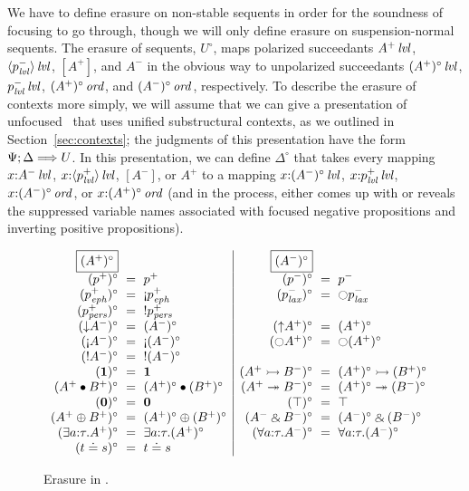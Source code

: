 We have to define erasure on non-stable sequents in order for the
soundness of focusing to go through, though we will only define
erasure on suspension-normal sequents.  The erasure of sequents,
$U^\circ$, maps polarized succeedants ${A^+}\,{{\it lvl}}$,
${\langle {p^-_{\it lvl}} \rangle}\,{{\it lvl}}$, $[A^+]$, and $A^-$ in the obvious way to
unpolarized succeedants ${(A^+)^\circ}\,{{\it lvl}}$, ${p^-_{\it lvl}}\,{{\it lvl}}$,
${(A^+)^\circ}\,{{\it ord}}$, and ${(A^-)^\circ}\,{{\it ord}}$, respectively.  To
describe the erasure of contexts more simply, we will assume that we
can give a presentation of unfocused \ollll~that uses unified
substructural contexts, as we outlined in
Section~\ref{sec:contexts}; the judgments of this presentation
have the form $\Psi; \Delta \Longrightarrow U$. 
In this presentation, we can define $\Delta^\circ$ that
takes every mapping $x{:}{A^-}\,{{\it lvl}}$, $x{:}{\langle {p^+_{\it lvl}} \rangle}\,{{\it lvl}}$,
$[A^-]$, or $A^+$ to a mapping $x{:}{(A^-)^\circ}\,{{\it lvl}}$,
$x{:}{p^+_{\it lvl}}\,{{\it lvl}}$, $x{:}{(A^-)^\circ}\,{{\it ord}}$, or
$x{:}{(A^+)^\circ}\,{{\it ord}}$ (and in the process, either comes up with
or reveals the suppressed variable names associated with focused
negative propositions and inverting positive propositions).

\begin{figure}
{\small \[
\begin{array}{rcl|rcl}
\fbox{$(A^+)^\circ$} & & &
\fbox{$(A^-)^\circ$} & & 
\\
(p^+)^\circ & \!\!\!=\!\!\! & p^+ &
(p^-)^\circ & \!\!\!=\!\!\! & p^- \\
(p^+_\meph)^\circ & \!\!\!=\!\!\! & {\gnab}p^+_\meph &
(p^-_\mlax)^\circ & \!\!\!=\!\!\! & {\ocircle}p^-_\mlax 
\\
(p^+_\mpers)^\circ & \!\!\!=\!\!\! & {!}p^+_\mpers &
& & 
\\
({\downarrow}A^-)^\circ & \!\!\!=\!\!\! & (A^-)^\circ &
({\uparrow}A^+)^\circ & \!\!\!=\!\!\! & (A^+)^\circ 
\\
({\gnab}A^-)^\circ & \!\!\!=\!\!\! & {\gnab}(A^-)^\circ &
({\ocircle}A^+)^\circ & \!\!\!=\!\!\! & {\ocircle}(A^+)^\circ 
\\
({!}A^-)^\circ & \!\!\!=\!\!\! & {!}(A^-)^\circ &
& & 
\\
(\one)^\circ & \!\!\!=\!\!\! & \one &
(A^+ \lefti B^-)^\circ & \!\!\!=\!\!\! & (A^+)^\circ \lefti (B^+)^\circ 
\\
(A^+ \fuse B^+)^\circ & \!\!\!=\!\!\! & (A^+)^\circ \fuse (B^+)^\circ &
(A^+ \righti B^-)^\circ & \!\!\!=\!\!\! & (A^+)^\circ \righti (B^-)^\circ 
\\
(\zero)^\circ & \!\!\!=\!\!\! & \zero &
(\top)^\circ & \!\!\!=\!\!\! & \top 
\\
(A^+ \oplus B^+)^\circ & \!\!\!=\!\!\! & (A^+)^\circ \oplus (B^+)^\circ &
(A^- \with B^-)^\circ & \!\!\!=\!\!\! & (A^-)^\circ \with (B^-)^\circ 
\\
(\exists a{:}\tau.A^+)^\circ & \!\!\!=\!\!\! & \exists a{:}\tau. (A^+)^\circ &
(\forall a{:}\tau.A^-)^\circ & \!\!\!=\!\!\! & \forall a{:}\tau. (A^-)^\circ 
\\
(t \doteq s)^\circ & \!\!\!=\!\!\! & t \doteq s &
& &
\end{array}
\]}

\caption{Erasure in \ollll.}
\label{fig:ord-erasure}
\end{figure}


